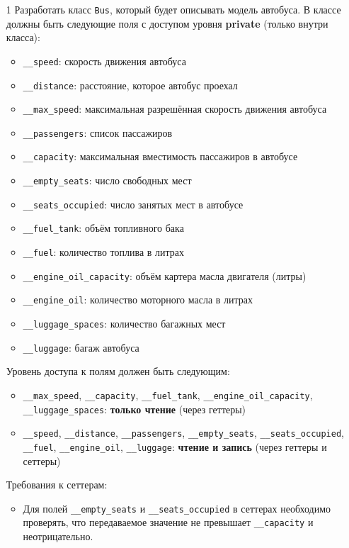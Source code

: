 \begin{enumerate}
\item[1] Разработать класс \texttt{Bus}, который будет описывать модель автобуса. В классе должны быть следующие поля с доступом уровня \textbf{private} (только внутри класса):
\begin{itemize}
    \item \texttt{\_\_speed}: скорость движения автобуса  
    \item \texttt{\_\_distance}: расстояние, которое автобус проехал  
    \item \texttt{\_\_max\_speed}: максимальная разрешённая скорость движения автобуса  
    \item \texttt{\_\_passengers}: список пассажиров  
    \item \texttt{\_\_capacity}: максимальная вместимость пассажиров в автобусе  
    \item \texttt{\_\_empty\_seats}: число свободных мест  
    \item \texttt{\_\_seats\_occupied}: число занятых мест в автобусе  
    \item \texttt{\_\_fuel\_tank}: объём топливного бака  
    \item \texttt{\_\_fuel}: количество топлива в литрах  
    \item \texttt{\_\_engine\_oil\_capacity}: объём картера масла двигателя (литры)  
    \item \texttt{\_\_engine\_oil}: количество моторного масла в литрах  
    \item \texttt{\_\_luggage\_spaces}: количество багажных мест  
    \item \texttt{\_\_luggage}: багаж автобуса  
\end{itemize}
Уровень доступа к полям должен быть следующим:
\begin{itemize}
    \item \texttt{\_\_max\_speed}, \texttt{\_\_capacity}, \texttt{\_\_fuel\_tank}, \texttt{\_\_engine\_oil\_capacity}, \texttt{\_\_luggage\_spaces}: \textbf{только чтение} (через геттеры)  
    \item \texttt{\_\_speed}, \texttt{\_\_distance}, \texttt{\_\_passengers}, \texttt{\_\_empty\_seats}, \texttt{\_\_seats\_occupied}, \texttt{\_\_fuel}, \texttt{\_\_engine\_oil}, \texttt{\_\_luggage}: \textbf{чтение и запись} (через геттеры и сеттеры)
\end{itemize}
Требования к сеттерам:
\begin{itemize}
    \item Для полей \texttt{\_\_empty\_seats} и \texttt{\_\_seats\_occupied} в сеттерах необходимо проверять, что передаваемое значение не превышает \texttt{\_\_capacity} и неотрицательно.  

\end{itemize}
\end{enumerate}
